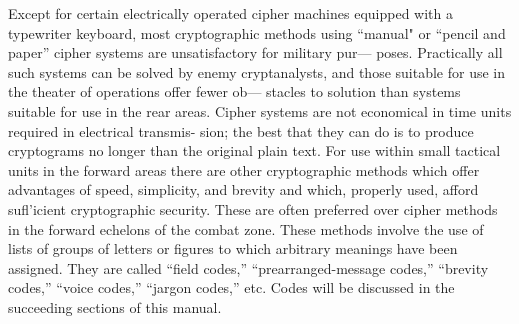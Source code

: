 Except for certain electrically operated cipher machines equipped with
a typewriter keyboard, most cryptographic methods using “manual"
or “pencil and paper” cipher systems are unsatisfactory for military pur—
poses. Practically all such systems can be solved by enemy cryptanalysts,
and those suitable for use in the theater of operations offer fewer ob—
stacles to solution than systems suitable for use in the rear areas. Cipher
systems are not economical in time units required in electrical transmis-
sion; the best that they can do is to produce cryptograms no longer than
the original plain text. For use within small tactical units in the forward
areas there are other cryptographic methods which offer advantages of
speed, simplicity, and brevity and which, properly used, afford suﬂ’icient
cryptographic security. These are often preferred over cipher methods in
the forward echelons of the combat zone. These methods involve the use
of lists of groups of letters or ﬁgures to which arbitrary meanings have
been assigned. They are called “ﬁeld codes,” “prearranged-message
codes,” “brevity codes,” “voice codes,” “jargon codes,” etc. Codes will
be discussed in the succeeding sections of this manual.
